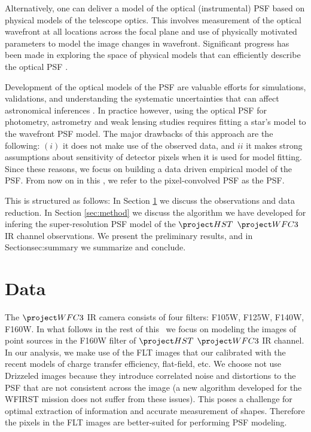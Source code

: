 Alternatively, one can deliver a model of the optical (instrumental) PSF based on physical models of the telescope optics. 
This involves measurement of the optical wavefront at all locations across the focal plane and use of physically motivated parameters 
to model the image changes in wavefront. Significant progress has been made in exploring the space of physical models that can efficiently 
describe the optical PSF \citep{zernike,krist1995,krist2011,galsim_software}. 

Development of the optical models of the PSF are valuable efforts for simulations, validations, and understanding the systematic uncertainties 
that can affect astronomical inferences \citep{great3,galsim}. In practice however, using the optical PSF for photometry, astrometry and weak lensing studies 
requires fitting a star's model to the wavefront PSF model. The major drawbacks of this approach are the following: $(i)$ it does not make use of the observed 
data, and ${ii}$ it makes strong assumptions about sensitivity of detector pixels when it is used for model fitting. Since these reasons, we focus on building a 
data driven empirical model of the PSF. From now on in this \paper, we refer to the pixel-convolved PSF as the PSF. 

This \paper is structured as follows: In Section \ref{sec:data} we discuss the observations and data reduction. In Section \ref{sec:method} we discuss the algorithm we 
have developed for infering the super-resolution PSF model of the $\hst$ $\wfc$ IR channel observations. We present the preliminary results, and %
in Section{sec:summary} we summarize and conclude. 

\section{Data}\label{sec:data}

The $\wfc$ IR camera consists of four filters: F105W, F125W, F140W, F160W.
In what follows in the rest of this \paper\ we focus on modeling the images of point sources in the F160W filter of $\hst$ $\wfc$ IR channel. 
In our analysis, we make use of the FLT images that our calibrated with the recent models of charge transfer efficiency, flat-field, etc. 
We choose not use Drizzeled images \citep{drizzle,astrodrizzle} because they introduce correlated noise and 
distortions to the PSF that are not consistent across the image (a new algorithm \citep{olic} developed for the WFIRST mission does not suffer from these issues). 
This poses a challenge for optimal extraction of information and accurate measurement of shapes. Therefore the pixels in the FLT images are better-suited for performing PSF modeling. 

